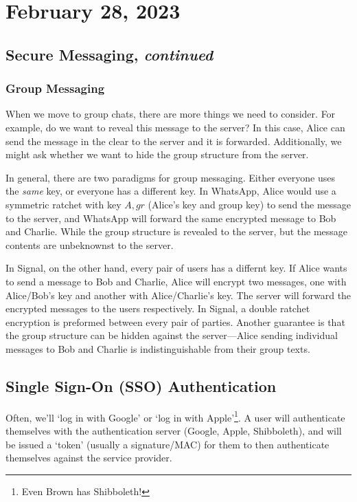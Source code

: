 \section{February 28, 2023}
\label{20230228}
\subsection{Secure Messaging, \emph{continued}}

\subsubsection{Group Messaging}
When we move to group chats, there are more things we need to consider. For example, do we want to reveal this message to the server? In this case, Alice can send the message in the clear to the server and it is forwarded. Additionally, we might ask whether we want to hide the group structure from the server.


In general, there are two paradigms for group messaging. Either everyone uses the \emph{same} key, or everyone has a different key. In WhatsApp, Alice would use a symmetric ratchet with key $A, gr$ (Alice's key and group key) to send the message to the server, and WhatsApp will forward the same encrypted message to Bob and Charlie. While the group structure is revealed to the server, but the message contents are unbeknownst to the server.


In Signal, on the other hand, every pair of users has a differnt key. If Alice wants to send a message to Bob and Charlie, Alice will encrypt two messages, one with Alice/Bob's key and another with Alice/Charlie's key. The server will forward the encrypted messages to the users respectively. In Signal, a double ratchet encryption is preformed between every pair of parties. Another guarantee is that the group structure can be hidden against the server---Alice sending individual messages to Bob and Charlie is indistinguishable from their group texts.


\subsection{Single Sign-On (SSO) Authentication}
Often, we'll `log in with Google' or `log in with Apple'\footnote{Even Brown has Shibboleth!}. A user will authenticate themselves with the authentication server (Google, Apple, Shibboleth), and will be issued a `token' (usually a signature/MAC) for them to then authenticate themselves against the service provider.

